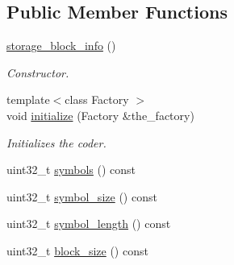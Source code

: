 \subsection*{Public Member Functions}
\begin{DoxyCompactItemize}
\item 
\hypertarget{classkodo_1_1storage__block__info_a6b347737f6555c2565e61c15e5f6ab8f}{\hyperlink{classkodo_1_1storage__block__info_a6b347737f6555c2565e61c15e5f6ab8f}{storage\-\_\-block\-\_\-info} ()}\label{classkodo_1_1storage__block__info_a6b347737f6555c2565e61c15e5f6ab8f}

\begin{DoxyCompactList}\small\item\em Constructor. \end{DoxyCompactList}\item 
{\footnotesize template$<$class Factory $>$ }\\void \hyperlink{classkodo_1_1storage__block__info_a7c55bd2ede39c83d0861bcfbbf6d24e8}{initialize} (Factory \&the\-\_\-factory)
\begin{DoxyCompactList}\small\item\em Initializes the coder. \end{DoxyCompactList}\item 
uint32\-\_\-t \hyperlink{classkodo_1_1storage__block__info_a6e93a3955031313f79a1aff4d48998bc}{symbols} () const 
\begin{DoxyCompactList}\small\item\em \end{DoxyCompactList}\item 
uint32\-\_\-t \hyperlink{classkodo_1_1storage__block__info_aa5b78c09d29d0a50d4ba56aa5b40ae75}{symbol\-\_\-size} () const 
\begin{DoxyCompactList}\small\item\em \end{DoxyCompactList}\item 
uint32\-\_\-t \hyperlink{classkodo_1_1storage__block__info_a2a7911140631551c8c68cb817e851bbe}{symbol\-\_\-length} () const 
\begin{DoxyCompactList}\small\item\em \end{DoxyCompactList}\item 
uint32\-\_\-t \hyperlink{classkodo_1_1storage__block__info_a4b5d4445dae9889a3550f52fdd4919c3}{block\-\_\-size} () const 
\begin{DoxyCompactList}\small\item\em \end{DoxyCompactList}\end{DoxyCompactItemize}
